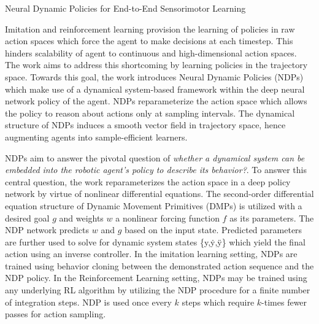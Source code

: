 \documentclass[11pt,letterpaper]{article}
\begin{document}
\begin{center}
  \large{Neural Dynamic Policies for End-to-End Sensorimotor Learning}
\end{center}

Imitation and reinforcement learning provision the learning of policies in raw action spaces which force the agent to make decisions at each timestep. This hinders scalability of agent to continuous and high-dimensional action spaces. The work aims to address this shortcoming by learning policies in the trajectory space. Towards this goal, the work introduces Neural Dynamic Policies (NDPs) which make use of a dynamical system-based framework within the deep neural network policy of the agent. NDPs reparameterize the action space which allows the policy to reason about actions only at sampling intervals. The dynamical structure of NDPs induces a smooth vector field in trajectory space, hence augmenting agents into sample-efficient learners. 

NDPs aim to answer the pivotal question of \textit{whether a dynamical system can be embedded into the robotic agent's policy to describe its behavior?}. To answer this central question, the work reparameterizes the action space in a deep policy network by virtue of nonlinear differential equations. The second-order differential equation structure of Dynamic Movement Primitives (DMPs) is utilized with a desired goal $g$ and weights $w$ a nonlinear forcing function $f$ as its parameters. The NDP network predicts $w$ and $g$ based on the input state. Predicted parameters are further used to solve for dynamic system states \{y,\.{y},\"{y}\} which yield the final action using an inverse controller. In the imitation learning setting, NDPs are trained using behavior cloning between the demonstrated action sequence and the NDP policy. In the Reinforcement Learning setting, NDPs may be trained using any underlying RL algorithm by utilizing the NDP procedure for a finite number of integration steps. NDP is used once every $k$ steps which require $k$-times fewer passes for action sampling. 
\end{document}
